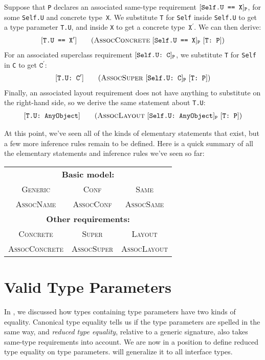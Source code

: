 \documentclass[../generics]{subfiles}
\begin{document}
Suppose that \texttt{P} declares an associated same-type requirement $[\texttt{Self.U == X}]_\texttt{P}$, for some \texttt{Self.U} and concrete type~\texttt{X}. We substitute \texttt{T} for \texttt{Self} inside \texttt{Self.U} to get a type parameter \texttt{T.U}, and inside \texttt{X} to get a concrete type~$\texttt{X}^\prime$. We can then derive:
\begin{gather*}
\AssocConcreteStepDef
\end{gather*}
For an associated superclass requirement $[\texttt{Self.U:~C}]_\texttt{P}$, we substitute \texttt{T} for \texttt{Self} in \texttt{C} to get $\texttt{C}^\prime$:
\begin{gather*}
\AssocSuperStepDef
\end{gather*}
Finally, an associated layout requirement does not have anything to substitute on the right-hand side, so we derive the same statement about \texttt{T.U}:
\begin{gather*}
\AssocLayoutStepDef
\end{gather*}

\pagebreak

At this point, we've seen all of the kinds of elementary statements that exist, but a few more inference rules remain to be defined. Here is a quick summary of all the elementary statements and inference rules we've seen so far:
\begin{center}
\begin{tabular}{ccc}
\toprule
\multicolumn{3}{c}{\textbf{Basic model:}}\\
\textsc{Generic}&\textsc{Conf}&\textsc{Same}\\
\textsc{AssocName}&\textsc{AssocConf}&\textsc{AssocSame}\\
\midrule
\multicolumn{3}{c}{\textbf{Other requirements:}}\\
\textsc{Concrete}&\textsc{Super}&\textsc{Layout}\\
\textsc{AssocConcrete}&\textsc{AssocSuper}&\textsc{AssocLayout}\\
\bottomrule
\end{tabular}
\end{center}

\section{Valid Type Parameters}\label{type params}

In , we discussed how types containing type parameters have two kinds of equality. Canonical type equality tells us if the type parameters are spelled in the same way, and \emph{reduced type equality}, relative to a generic signature, also takes same-type requirements into account. We are now in a position to define reduced type equality on type parameters.  will generalize it to all interface types.
\end{document}
